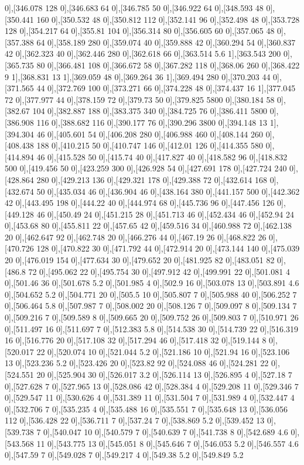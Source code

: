 {0],[346.078 128 0],[346.683 64 0],[346.785 50 0],[346.922 64 0],[348.593 48 0],[350.441 160 0],[350.532 48 0],[350.812 112 0],[352.141 96 0],[352.498 48 0],[353.728 128 0],[354.217 64 0],[355.81 104 0],[356.314 80 0],[356.605 60 0],[357.065 48 0],[357.388 64 0],[358.189 280 0],[359.074 40 0],[359.888 42 0],[360.294 54 0],[360.837 42 0],[362.323 40 0],[362.446 280 0],[362.618 66 0],[363.514 5.6 1],[363.543 200 0],[365.735 80 0],[366.481 108 0],[366.672 58 0],[367.282 118 0],[368.06 260 0],[368.422 9 1],[368.831 13 1],[369.059 48 0],[369.264 36 1],[369.494 280 0],[370.203 44 0],[371.565 44 0],[372.769 100 0],[373.271 66 0],[374.228 48 0],[374.437 16 1],[377.045 72 0],[377.977 44 0],[378.159 72 0],[379.73 50 0],[379.825 5800 0],[380.184 58 0],[382.67 104 0],[382.887 188 0],[383.375 340 0],[384.725 76 0],[386.411 5800 0],[386.908 116 0],[388.682 116 0],[390.177 76 0],[390.296 3800 0],[394.148 13 1],[394.304 46 0],[405.601 54 0],[406.208 280 0],[406.988 460 0],[408.144 260 0],[408.438 188 0],[410.215 50 0],[410.747 146 0],[412.01 126 0],[414.355 580 0],[414.894 46 0],[415.528 50 0],[415.74 40 0],[417.827 40 0],[418.582 96 0],[418.832 500 0],[419.456 50 0],[423.259 300 0],[426.928 54 0],[427.691 178 0],[427.724 240 0],[428.864 280 0],[429.213 136 0],[429.321 178 0],[429.388 72 0],[432.614 168 0],[432.674 50 0],[435.034 46 0],[436.904 46 0],[438.164 380 0],[441.157 500 0],[442.362 42 0],[443.495 198 0],[444.22 40 0],[444.974 68 0],[445.736 96 0],[447.456 126 0],[449.128 46 0],[450.49 24 0],[451.215 28 0],[451.713 46 0],[452.434 46 0],[452.94 24 0],[453.68 80 0],[455.811 22 0],[457.65 42 0],[459.516 34 0],[460.988 72 0],[462.138 20 0],[462.647 92 0],[462.748 20 0],[466.276 44 0],[467.19 26 0],[468.822 26 0],[470.726 128 0],[470.822 30 0],[471.792 44 0],[472.914 20 0],[473.144 140 0],[475.039 20 0],[476.019 154 0],[477.634 30 0],[479.652 20 0],[481.925 82 0],[483.051 82 0],[486.8 72 0],[495.062 22 0],[495.754 30 0],[497.912 42 0],[499.991 22 0],[501.081 4 0],[501.46 36 0],[501.678 5.2 0],[501.985 4 0],[502.9 16 0],[503.078 13 0],[503.891 4.6 0],[504.652 5.2 0],[504.771 20 0],[505.5 10 0],[505.807 7 0],[505.988 40 0],[506.252 7 0],[506.464 5.8 0],[507.987 7 0],[508.002 20 0],[508.126 7 0],[509.097 8 0],[509.134 7 0],[509.216 7 0],[509.589 8 0],[509.665 20 0],[509.752 26 0],[509.803 7 0],[510.971 26 0],[511.497 16 0],[511.697 7 0],[512.383 5.8 0],[514.538 30 0],[514.739 22 0],[516.319 16 0],[516.776 20 0],[517.108 32 0],[517.294 46 0],[517.418 32 0],[519.144 8 0],[520.017 22 0],[520.074 10 0],[521.044 5.2 0],[521.186 10 0],[521.94 16 0],[523.106 13 0],[523.236 5.2 0],[523.426 20 0],[523.82 92 0],[524.088 46 0],[524.281 22 0],[524.551 20 0],[525.904 30 0],[526.017 3.2 0],[526.114 13 0],[526.895 4 0],[527.18 7 0],[527.628 7 0],[527.965 13 0],[528.086 42 0],[528.384 4 0],[529.208 11 0],[529.346 7 0],[529.547 11 0],[530.626 4 0],[531.389 11 0],[531.504 7 0],[531.989 4 0],[532.447 4 0],[532.706 7 0],[535.235 4 0],[535.488 16 0],[535.551 7 0],[535.648 13 0],[536.056 112 0],[536.428 22 0],[536.711 7 0],[537.24 7 0],[538.869 5.2 0],[539.452 13 0],[539.738 7 0],[540.047 10 0],[540.579 7 0],[540.639 7 0],[541.738 8 0],[542.689 4.6 0],[543.568 11 0],[543.775 13 0],[545.051 8 0],[545.646 7 0],[546.053 5.2 0],[546.557 4.6 0],[547.59 7 0],[549.028 7 0],[549.217 4 0],[549.38 5.2 0],[549.849 5.2 }
